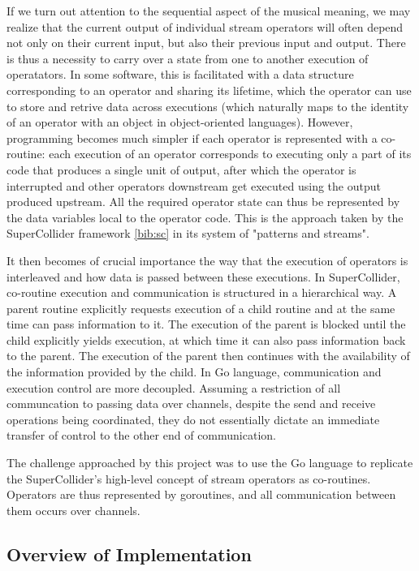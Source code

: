 \documentclass {article}
\begin{document}
If we turn out attention to the sequential aspect of the musical meaning, we may realize that the current output of individual stream operators will often depend not only on their current input, but also their previous input and output. There is thus a necessity to carry over a state from one to another execution of operatators. In some software, this is facilitated with a data structure corresponding to an operator and sharing its lifetime, which the operator can use to store and retrive data across executions (which naturally maps to the identity of an operator with an object in object-oriented languages). However, programming becomes much simpler if each operator is represented with a co-routine: each execution of an operator corresponds to executing only a part of its code that produces a single unit of output, after which the operator is interrupted and other operators downstream get executed using the output produced upstream. All the required operator state can thus be represented by the data variables local to the operator code. This is the approach taken by the SuperCollider framework \ref{bib:sc} in its system of "patterns and streams".

It then becomes of crucial importance the way that the execution of operators is interleaved and how data is passed between these executions. In SuperCollider, co-routine execution and communication is structured in a hierarchical way. A parent routine explicitly requests execution of a child routine and at the same time can pass information to it. The execution of the parent is blocked until the child explicitly yields execution, at which time it can also pass information back to the parent. The execution of the parent then continues with the availability of the information provided by the child. In Go language, communication and execution control are more decoupled. Assuming a restriction of all communcation to passing data over channels, despite the send and receive operations being coordinated, they do not essentially dictate an immediate transfer of control to the other end of communication.

The challenge approached by this project was to use the Go language to replicate the SuperCollider's high-level concept of stream operators as co-routines. Operators are thus represented by goroutines, and all communication between them occurs over channels.

\subsection{Overview of Implementation}
\end{document}
